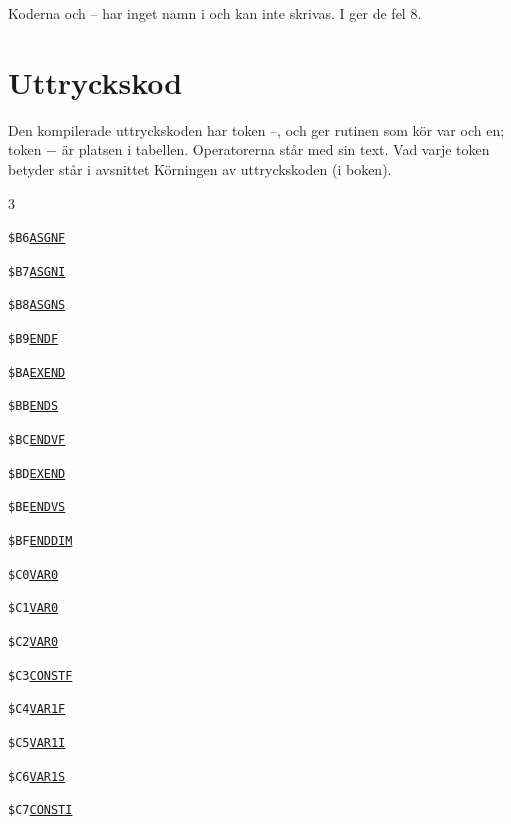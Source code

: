 \noindent Koderna  och – har inget namn i
 och kan inte skrivas. I  ger de fel 8.\par
\section{Uttryckskod}
\noindent Den kompilerade uttryckskoden har token –, och
 ger rutinen som kör var och en; token $-$  är
platsen i tabellen. Operatorerna står med sin text. Vad varje token betyder
står i avsnittet Körningen av uttryckskoden
(i boken).\par\medskip
\begin{multicols}{3}\small\raggedright
\noindent\texttt{\$B6}\quad \hyperlink{l:ASGNF}{\texttt{ASGNF}}\par
\noindent\texttt{\$B7}\quad \hyperlink{l:ASGNI}{\texttt{ASGNI}}\par
\noindent\texttt{\$B8}\quad \hyperlink{l:ASGNS}{\texttt{ASGNS}}\par
\noindent\texttt{\$B9}\quad \hyperlink{l:ENDF}{\texttt{ENDF}}\par
\noindent\texttt{\$BA}\quad \hyperlink{l:EXEND}{\texttt{EXEND}}\par
\noindent\texttt{\$BB}\quad \hyperlink{l:ENDS}{\texttt{ENDS}}\par
\noindent\texttt{\$BC}\quad \hyperlink{l:ENDVF}{\texttt{ENDVF}}\par
\noindent\texttt{\$BD}\quad \hyperlink{l:EXEND}{\texttt{EXEND}}\par
\noindent\texttt{\$BE}\quad \hyperlink{l:ENDVS}{\texttt{ENDVS}}\par
\noindent\texttt{\$BF}\quad \hyperlink{l:ENDDIM}{\texttt{ENDDIM}}\par
\noindent\texttt{\$C0}\quad \hyperlink{l:VAR0}{\texttt{VAR0}}\par
\noindent\texttt{\$C1}\quad \hyperlink{l:VAR0}{\texttt{VAR0}}\par
\noindent\texttt{\$C2}\quad \hyperlink{l:VAR0}{\texttt{VAR0}}\par
\noindent\texttt{\$C3}\quad \hyperlink{l:CONSTF}{\texttt{CONSTF}}\par
\noindent\texttt{\$C4}\quad \hyperlink{l:VAR1F}{\texttt{VAR1F}}\par
\noindent\texttt{\$C5}\quad \hyperlink{l:VAR1I}{\texttt{VAR1I}}\par
\noindent\texttt{\$C6}\quad \hyperlink{l:VAR1S}{\texttt{VAR1S}}\par
\noindent\texttt{\$C7}\quad \hyperlink{l:CONSTI}{\texttt{CONSTI}}\par

\end{multicols}
